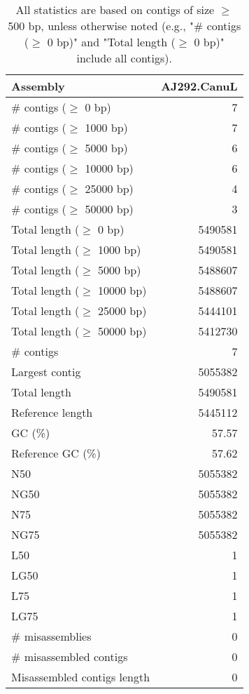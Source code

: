 \documentclass[12pt,a4paper]{article}
\begin{document}
\begin{table}[ht]
\begin{center}
\caption{All statistics are based on contigs of size $\geq$ 500 bp, unless otherwise noted (e.g., "\# contigs ($\geq$ 0 bp)" and "Total length ($\geq$ 0 bp)" include all contigs).}
\begin{tabular}{|l*{1}{|r}|}
\hline
Assembly & AJ292.CanuL \\ \hline
\# contigs ($\geq$ 0 bp) & 7 \\ \hline
\# contigs ($\geq$ 1000 bp) & 7 \\ \hline
\# contigs ($\geq$ 5000 bp) & 6 \\ \hline
\# contigs ($\geq$ 10000 bp) & 6 \\ \hline
\# contigs ($\geq$ 25000 bp) & 4 \\ \hline
\# contigs ($\geq$ 50000 bp) & 3 \\ \hline
Total length ($\geq$ 0 bp) & 5490581 \\ \hline
Total length ($\geq$ 1000 bp) & 5490581 \\ \hline
Total length ($\geq$ 5000 bp) & 5488607 \\ \hline
Total length ($\geq$ 10000 bp) & 5488607 \\ \hline
Total length ($\geq$ 25000 bp) & 5444101 \\ \hline
Total length ($\geq$ 50000 bp) & 5412730 \\ \hline
\# contigs & 7 \\ \hline
Largest contig & 5055382 \\ \hline
Total length & 5490581 \\ \hline
Reference length & 5445112 \\ \hline
GC (\%) & 57.57 \\ \hline
Reference GC (\%) & 57.62 \\ \hline
N50 & 5055382 \\ \hline
NG50 & 5055382 \\ \hline
N75 & 5055382 \\ \hline
NG75 & 5055382 \\ \hline
L50 & 1 \\ \hline
LG50 & 1 \\ \hline
L75 & 1 \\ \hline
LG75 & 1 \\ \hline
\# misassemblies & 0 \\ \hline
\# misassembled contigs & 0 \\ \hline
Misassembled contigs length & 0 \\ \hline

\end{tabular}
\end{center}
\end{table}
\end{document}
